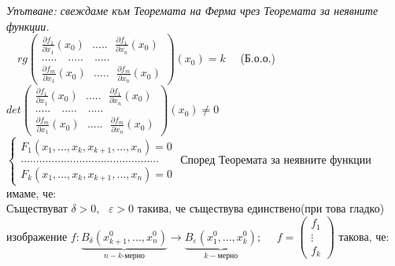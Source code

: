 \documentclass[12pt]{article}
\newcommand{\spc}{\text{ }}
\begin{document}
	\textit{Упътване: свеждаме към Теоремата на Ферма чрез Теоремата за неявните функции.}\\
	$\spc$
	\begin{math}
		rg\begin{pmatrix}
			\frac{\partial f_1}{\partial x_1}(x_0)
			\spc ..... \spc
			\frac{\partial f_1}{\partial x_n}(x_0)
			\\
			..... \quad ..... \quad .....
			\\
			\frac{\partial f_m}{\partial x_1}(x_0)
			\spc ..... \spc
			\frac{\partial f_m}{\partial x_n}(x_0)
		\end{pmatrix}(x_0) = k
		\quad
	\end{math}
	(Б.о.о.)
	\begin{math}
		det\begin{pmatrix}
			\frac{\partial f_1}{\partial x_1}(x_0)
			\spc ..... \spc
			\frac{\partial f_1}{\partial x_n}(x_0)
			\\
			..... \quad ..... \quad .....
			\\
			\frac{\partial f_m}{\partial x_1}(x_0)
			\spc ..... \spc
			\frac{\partial f_m}{\partial x_n}(x_0)
		\end{pmatrix}(x_0) \neq 0
	\end{math}
	\\
	$\spc$
	\\
	\begin{math}
		\begin{cases*}
			F_1(x_1,...,x_k,x_{k+1},...,x_n) = 0
			\\
			.............................................
			\\
			F_k(x_1,...,x_k,x_{k+1},...,x_n) = 0
		\end{cases*}
	\end{math}
	Според Теоремата за неявните функции имаме, че:\\
	Съществуват $\delta>0,\spc \varepsilon>0$ такива, че съществува единствено(при това гладко) изображение $f:\underset{n-k\text{-мерно}}{\underbrace{B_\delta(x_{k+1}^0, ..., x_n^0)}} \longrightarrow \underset{k-\text{мерно}}{\underbrace{B_\varepsilon(x_1^0,...,x_k^0)}}; \quad$
	\begin{math}
		f = 		\begin{pmatrix}
			f_1 \\
			\vdots \\
			f_k
		\end{pmatrix}
	\end{math}
	 такова, че:\\
\end{document}
